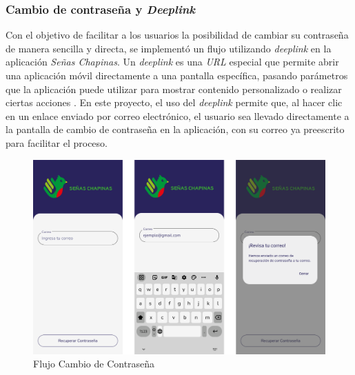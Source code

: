 
\subsubsection{Cambio de contraseña y \textit{Deeplink}}

Con el objetivo de facilitar a los usuarios la posibilidad de cambiar su contraseña de manera sencilla y directa, se implementó un flujo utilizando \textit{deeplink} en la aplicación \textit{Señas Chapinas}. Un \textit{deeplink }es una \textit{URL} especial que permite abrir una aplicación móvil directamente a una pantalla específica, pasando parámetros que la aplicación puede utilizar para mostrar contenido personalizado o realizar ciertas acciones \cite{meijomil2024}. En este proyecto, el uso del \textit{deeplink} permite que, al hacer clic en un enlace enviado por correo electrónico, el usuario sea llevado directamente a la pantalla de cambio de contraseña en la aplicación, con su correo ya preescrito para facilitar el proceso.

\begin{figure} [H]
    \centering
    \includegraphics[width=0.5\linewidth]{figuras/cambio_contra_flujo.png}
    \caption{Flujo Cambio de Contraseña}
    \label{fig:enter-label}
\end{figure}


